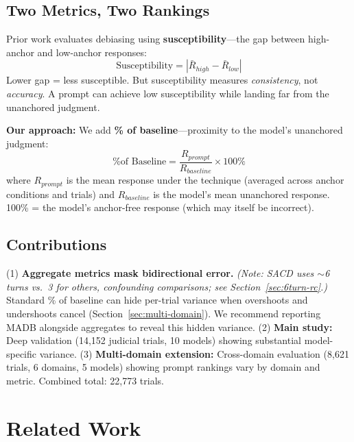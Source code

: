 \documentclass[11pt]{article}
\begin{document}
\subsection{Two Metrics, Two Rankings}
\label{sec:two-metrics}

Prior work evaluates debiasing using \textbf{susceptibility}---the gap between high-anchor and low-anchor responses:
\begin{equation}
\text{Susceptibility} = |\bar{R}_{high} - \bar{R}_{low}|
\end{equation}
Lower gap = less susceptible. But susceptibility measures \textit{consistency}, not \textit{accuracy}. A prompt can achieve low susceptibility while landing far from the unanchored judgment.

\textbf{Our approach:} We add \textbf{\% of baseline}---proximity to the model's unanchored judgment:
\begin{equation}
\text{\% of Baseline} = \frac{R_{prompt}}{R_{baseline}} \times 100\%
\end{equation}
where $R_{prompt}$ is the mean response under the technique (averaged across anchor conditions and trials) and $R_{baseline}$ is the model's mean unanchored response. 100\% = the model's anchor-free response (which may itself be incorrect).

\subsection{Contributions}

(1) \textbf{Aggregate metrics mask bidirectional error.} \textit{(Note: SACD uses $\sim$6 turns vs.\ 3 for others, confounding comparisons; see Section~\ref{sec:6turn-rc}.)} Standard \% of baseline can hide per-trial variance when overshoots and undershoots cancel (Section~\ref{sec:multi-domain}). We recommend reporting MADB alongside aggregates to reveal this hidden variance.
(2) \textbf{Main study:} Deep validation (14,152 judicial trials, 10 models) showing substantial model-specific variance.
(3) \textbf{Multi-domain extension:} Cross-domain evaluation (8,621 trials, 6 domains, 5 models) showing prompt rankings vary by domain and metric. Combined total: 22,773 trials.

\section{Related Work}
\end{document}
